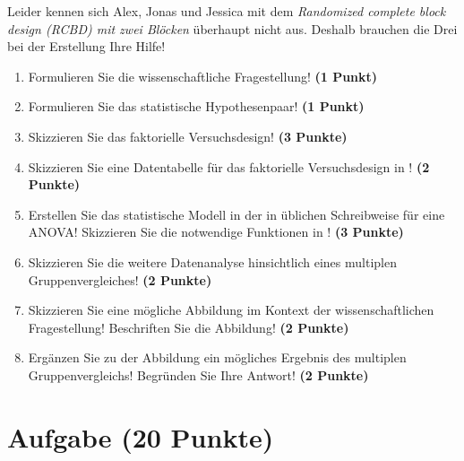 \documentclass[a4paper, 9pt]{scrartcl}\usepackage[]{graphicx}\usepackage[]{xcolor}
\begin{document}
Leider kennen sich Alex, Jonas und Jessica mit dem \textit{Randomized complete block design (RCBD) mit zwei Blöcken} überhaupt nicht aus. Deshalb brauchen die Drei bei der Erstellung Ihre Hilfe!

\begin{enumerate}
  \setcounter{enumi}{0}
  \item Formulieren Sie die wissenschaftliche Fragestellung! \textbf{(1 Punkt)}
  \item Formulieren Sie das statistische Hypothesenpaar! \textbf{(1 Punkt)}
  \item Skizzieren Sie das faktorielle Versuchsdesign! \textbf{(3 Punkte)}
  \item Skizzieren Sie eine Datentabelle für das faktorielle Versuchsdesign in \Rlogo! \textbf{(2 Punkte)}
  \item Erstellen Sie das statistische Modell in der in \Rlogo üblichen Schreibweise für eine ANOVA! Skizzieren Sie die notwendige Funktionen in \Rlogo! \textbf{(3 Punkte)}
  \item Skizzieren Sie die weitere Datenanalyse hinsichtlich eines multiplen Gruppenvergleiches! \textbf{(2 Punkte)}
  \item Skizzieren Sie eine mögliche Abbildung im Kontext der wissenschaftlichen Fragestellung! Beschriften Sie die Abbildung! \textbf{(2 Punkte)}
  \item Ergänzen Sie zu der Abbildung ein mögliches Ergebnis des multiplen Gruppenvergleichs! Begründen Sie Ihre Antwort! \textbf{(2 Punkte)}
\end{enumerate}


 
\clearpage

\section{Aufgabe \hfill (20 Punkte)}
\end{document}
